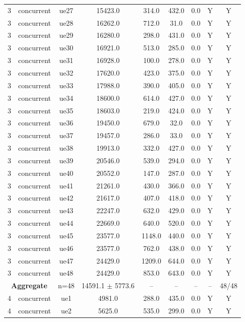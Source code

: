 \begin{table}[ht]
\begin{tabular}{|c|c|c|c|c|c|c|c|c|}
3 & concurrent & ue27 & 15423.0 & 314.0 & 432.0 & 0.0 & Y & Y \\
3 & concurrent & ue28 & 16262.0 & 712.0 & 31.0 & 0.0 & Y & Y \\
3 & concurrent & ue29 & 16280.0 & 298.0 & 431.0 & 0.0 & Y & Y \\
3 & concurrent & ue30 & 16921.0 & 513.0 & 285.0 & 0.0 & Y & Y \\
3 & concurrent & ue31 & 16928.0 & 100.0 & 278.0 & 0.0 & Y & Y \\
3 & concurrent & ue32 & 17620.0 & 423.0 & 375.0 & 0.0 & Y & Y \\
3 & concurrent & ue33 & 17988.0 & 390.0 & 405.0 & 0.0 & Y & Y \\
3 & concurrent & ue34 & 18600.0 & 614.0 & 427.0 & 0.0 & Y & Y \\
3 & concurrent & ue35 & 18603.0 & 219.0 & 424.0 & 0.0 & Y & Y \\
3 & concurrent & ue36 & 19450.0 & 679.0 & 32.0 & 0.0 & Y & Y \\
3 & concurrent & ue37 & 19457.0 & 286.0 & 33.0 & 0.0 & Y & Y \\
3 & concurrent & ue38 & 19913.0 & 332.0 & 427.0 & 0.0 & Y & Y \\
3 & concurrent & ue39 & 20546.0 & 539.0 & 294.0 & 0.0 & Y & Y \\
3 & concurrent & ue40 & 20552.0 & 147.0 & 287.0 & 0.0 & Y & Y \\
3 & concurrent & ue41 & 21261.0 & 430.0 & 366.0 & 0.0 & Y & Y \\
3 & concurrent & ue42 & 21617.0 & 407.0 & 418.0 & 0.0 & Y & Y \\
3 & concurrent & ue43 & 22247.0 & 632.0 & 429.0 & 0.0 & Y & Y \\
3 & concurrent & ue44 & 22669.0 & 640.0 & 520.0 & 0.0 & Y & Y \\
3 & concurrent & ue45 & 23577.0 & 1148.0 & 440.0 & 0.0 & Y & Y \\
3 & concurrent & ue46 & 23577.0 & 762.0 & 438.0 & 0.0 & Y & Y \\
3 & concurrent & ue47 & 24429.0 & 1209.0 & 644.0 & 0.0 & Y & Y \\
3 & concurrent & ue48 & 24429.0 & 853.0 & 643.0 & 0.0 & Y & Y \\
\multicolumn{2}{|c|}{\textbf{Aggregate}} & n=48 & 14591.1 $\pm$ 5773.6 & -- & -- & -- & -- & 48/48 \\
\hline
4 & concurrent & ue1 & 4981.0 & 288.0 & 435.0 & 0.0 & Y & Y \\
4 & concurrent & ue2 & 5625.0 & 535.0 & 299.0 & 0.0 & Y & Y \\

\end{tabular}
\end{table}
